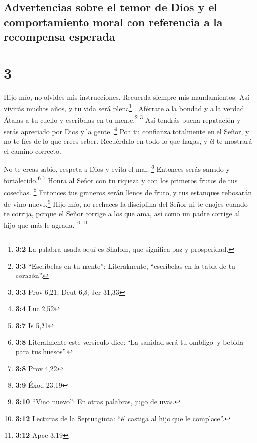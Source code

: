 \hypertarget{advertencias-sobre-el-temor-de-dios-y-el-comportamiento-moral-con-referencia-a-la-recompensa-esperada}{%
\subsection{Advertencias sobre el temor de Dios y el comportamiento
moral con referencia a la recompensa
esperada}\label{advertencias-sobre-el-temor-de-dios-y-el-comportamiento-moral-con-referencia-a-la-recompensa-esperada}}

\hypertarget{section-2}{%
\section{3}\label{section-2}}

 Hijo mío, no olvides mis instrucciones. Recuerda siempre
mis mandamientos.  Así vivirás muchos años, y tu vida será
plena\footnote{\textbf{3:2} La palabra usada aquí es Shalom, que
  significa paz y prosperidad.} .  Aférrate a la bondad y
a la verdad. Átalas a tu cuello y escríbelas en tu mente.\footnote{\textbf{3:3}
  ``Escríbelas en tu mente'': Literalmente, ``escríbelas en la tabla de
  tu corazón''.} \footnote{\textbf{3:3} Prov 6,21; Deut 6,8; Jer 31,33}
 Así tendrás buena reputación y serás apreciado por Dios y
la gente. \footnote{\textbf{3:4} Luc 2,52}  Pon tu
confianza totalmente en el Señor, y no te fíes de lo que crees saber.
 Recuérdalo en todo lo que hagas, y él te mostrará el
camino correcto.

 No te creas sabio, respeta a Dios y evita el mal.
\footnote{\textbf{3:7} Is 5,21}  Entonces serás sanado y
fortalecido.\footnote{\textbf{3:8} Literalmente este versículo dice:
  ``La sanidad será tu ombligo, y bebida para tus huesos''.} \footnote{\textbf{3:8}
  Prov 4,22}  Honra al Señor con tu riqueza y con los
primeros frutos de tus cosechas. \footnote{\textbf{3:9} Éxod 23,19}
 Entonces tus graneros serán llenos de fruto, y tus
estanques rebosarán de vino nuevo.\footnote{\textbf{3:10} ``Vino
  nuevo'': En otras palabras, jugo de uvas.}  Hijo mío,
no rechaces la disciplina del Señor ni te enojes cuando te corrija,
 porque el Señor corrige a los que ama, así como un padre
corrige al hijo que más le agrada.\footnote{\textbf{3:12} Lecturas de la
  Septuaginta: ``él castiga al hijo que le complace''.} \footnote{\textbf{3:12}
  Apoc 3,19}

